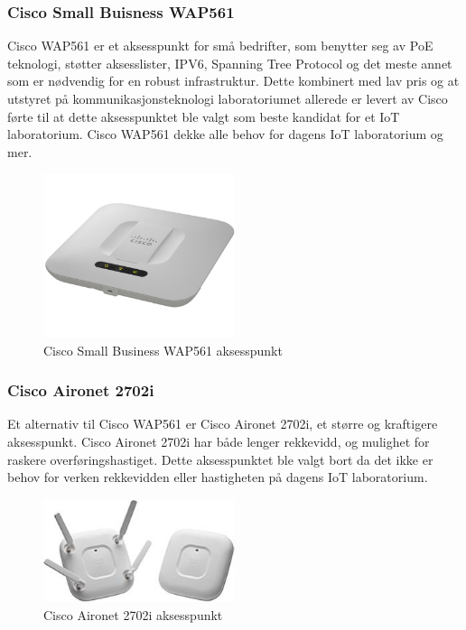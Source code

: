 \documentclass{article}
\begin{document}
\subsubsection{Cisco Small Buisness WAP561}
Cisco WAP561\cite{ciscowap} er et aksesspunkt for små bedrifter, som benytter seg av PoE teknologi, støtter aksesslister, IPV6, Spanning Tree Protocol og det meste annet som er nødvendig for en robust infrastruktur. Dette kombinert med lav pris og at utstyret på kommunikasjonsteknologi laboratoriumet allerede er levert av Cisco førte til at dette aksesspunktet ble valgt som beste kandidat for et IoT laboratorium. Cisco WAP561 dekke alle behov for dagens IoT laboratorium og mer. 

\begin{figure}[!ht]
  \centering
      \includegraphics[width=0.5\textwidth]{ciscowap}
  \caption {Cisco Small Business WAP561 aksesspunkt}
\end{figure}


\subsubsection{Cisco Aironet 2702i }
Et alternativ til Cisco WAP561 er Cisco Aironet 2702i\cite{ciscoaironet}, et større og kraftigere aksesspunkt. Cisco Aironet 2702i har både lenger rekkevidd, og mulighet for raskere overføringshastiget. Dette aksesspunktet ble valgt bort da det ikke er behov for verken rekkevidden eller hastigheten på dagens IoT laboratorium.

\begin{figure}[!ht]
  \centering
      \includegraphics[width=0.5\textwidth]{ciscoaironet}
  \caption {Cisco Aironet 2702i aksesspunkt}
\end{figure}
\end{document}

